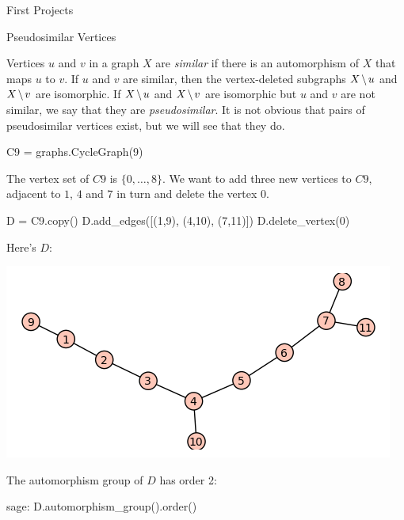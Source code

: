 \begin{chap}{First Projects}
%
\begin{sect}{Pseudosimilar Vertices}
%
\begin{para}
Vertices $u$ and $v$ in a graph $X$ are \textsl{similar} if there is an automorphism
of $X$ that maps $u$ to $v$. If $u$ and $v$ are similar, then the vertex-deleted
subgraphs $X\mathbin{\mkern-1.5mu\setminus\mkern-1.5mu} u$ and $X\mathbin{\mkern-1.5mu\setminus\mkern-1.5mu} v$ are isomorphic. If $X\mathbin{\mkern-1.5mu\setminus\mkern-1.5mu} u$ and $X\mathbin{\mkern-1.5mu\setminus\mkern-1.5mu} v$ 
are isomorphic but $u$ and $v$ are not similar, we say that they are
\textsl{pseudosimilar}. It is not obvious that pairs of pseudosimilar vertices
exist, but we will see that they do.
\end{para}
%
\begin{sageblock}
    C9 = graphs.CycleGraph(9)
\end{sageblock}
%
\begin{para}
The vertex set of $C9$ is $\{0,\ldots,8\}$. We want to add three new vertices
to $C9$, adjacent to $1$, $4$ and $7$ in turn and delete the vertex $0$.
\end{para}
%
\begin{sageblock}
    D = C9.copy()
    D.add_edges([(1,9), (4,10), (7,11)])
    D.delete_vertex(0)
\end{sageblock}
%
\begin{para}
Here's $D$:
\end{para}
%
\begin{para}
\includegraphics{graphplot.png}
\end{para}
%
\begin{para}
The automorphism group of $D$ has order 2:
\end{para}
%
\begin{sageexample}
    sage: D.automorphism_group().order()
\end{sageexample}
%
\begin{para}

\end{para}
\end{sect}
\end{chap}
